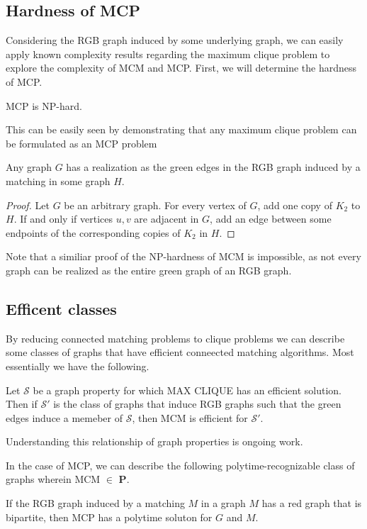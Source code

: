 \subsection{Hardness of MCP}
Considering the RGB graph induced by some underlying graph, we can easily apply known complexity results regarding the maximum clique problem to explore the complexity of MCM and MCP.  First, we will determine the hardness of MCP.
\begin{theorem}
	MCP is NP-hard.
\end{theorem}
This can be easily seen by demonstrating that any maximum clique problem can be formulated as an MCP problem
\begin{lem}
	Any graph $G$ has a realization as the green edges in the RGB graph induced by a matching in some graph $H$.
\end{lem}
\begin{proof}
	Let $G$ be an arbitrary graph.  For every vertex of $G$, add one copy of $K_2$ to $H$.  If and only if vertices $u,v$ are adjacent in $G$, add an edge between some endpoints of the corresponding copies of $K_2$ in $H$.
\end{proof}
Note that a similiar proof of the NP-hardness of MCM is impossible, as not every graph can be realized as the entire green graph of an RGB graph.
\subsection{Efficent classes}
By reducing connected matching problems to clique problems we can describe some classes of graphs that have efficient conneected matching algorithms.  Most essentially we have the following.
\begin{theorem}
	Let $\mathcal{S}$ be a graph property for which MAX CLIQUE has an efficient solution.  Then if $\mathcal{S'}$ is the class of graphs that induce RGB graphs such that the green edges induce a memeber of $\mathcal{S}$, then MCM is efficient for $\mathcal{S'}$. 
\end{theorem} 
Understanding this relationship of graph properties is ongoing work.

In the case of MCP, we can describe the following polytime-recognizable class of graphs wherein MCM $\in$ \textbf{P}.
\begin{prop}
	If the RGB graph induced by a matching $M$ in a graph $M$ has a red graph that is bipartite, then MCP has a polytime soluton for $G$ and $M$.
\end{prop}
